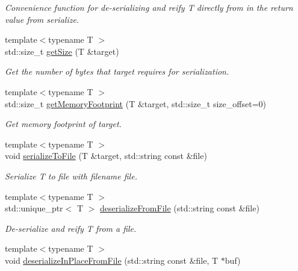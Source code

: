 \begin{DoxyCompactItemize}
\begin{DoxyCompactList}\small\item\em Convenience function for de-\/serializing and reify {\ttfamily T} directly from {\ttfamily in} the return value from {\ttfamily serialize}. \end{DoxyCompactList}\item 
{\footnotesize template$<$typename T $>$ }\\std\+::size\+\_\+t \hyperlink{namespacecheckpoint_af0e68ef201b5e6831939bcd752e1b18b}{get\+Size} (T \&target)
\begin{DoxyCompactList}\small\item\em Get the number of bytes that {\ttfamily target} requires for serialization. \end{DoxyCompactList}\item 
{\footnotesize template$<$typename T $>$ }\\std\+::size\+\_\+t \hyperlink{namespacecheckpoint_a3c06c0dd0b9bccfd2aa6b79570b9cda1}{get\+Memory\+Footprint} (T \&target, std\+::size\+\_\+t size\+\_\+offset=0)
\begin{DoxyCompactList}\small\item\em Get memory footprint of {\ttfamily target}. \end{DoxyCompactList}\item 
{\footnotesize template$<$typename T $>$ }\\void \hyperlink{namespacecheckpoint_a3d4326982e3c3feeb933e985758eea82}{serialize\+To\+File} (T \&target, std\+::string const \&file)
\begin{DoxyCompactList}\small\item\em Serialize {\ttfamily T} to file with filename {\ttfamily file}. \end{DoxyCompactList}\item 
{\footnotesize template$<$typename T $>$ }\\std\+::unique\+\_\+ptr$<$ T $>$ \hyperlink{namespacecheckpoint_ad71bcfe197379c59aa16f737b7e2cf3e}{deserialize\+From\+File} (std\+::string const \&file)
\begin{DoxyCompactList}\small\item\em De-\/serialize and reify {\ttfamily T} from a file. \end{DoxyCompactList}\item 
{\footnotesize template$<$typename T $>$ }\\void \hyperlink{namespacecheckpoint_a4a98c599eb8a73519cd643bfafb739d5}{deserialize\+In\+Place\+From\+File} (std\+::string const \&file, T $\ast$buf)

\end{DoxyCompactItemize}
